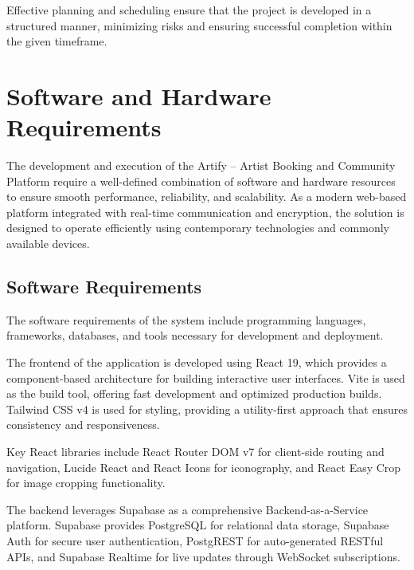 \documentclass[12pt,a4paper]{report}
\begin{document}
Effective planning and scheduling ensure that the project is developed in a structured manner, minimizing risks and ensuring successful completion within the given timeframe.

\setcounter{chapter}{3}
\clearpage
\thispagestyle{empty}

\noindent
{}

\clearpage
{}
\setcounter{section}{0}
\section{Software and Hardware Requirements}

The development and execution of the Artify -- Artist Booking and Community Platform require a well-defined combination of software and hardware resources to ensure smooth performance, reliability, and scalability. As a modern web-based platform integrated with real-time communication and encryption, the solution is designed to operate efficiently using contemporary technologies and commonly available devices.

\subsection{Software Requirements}

The software requirements of the system include programming languages, frameworks, databases, and tools necessary for development and deployment.

The frontend of the application is developed using React 19, which provides a component-based architecture for building interactive user interfaces. Vite is used as the build tool, offering fast development and optimized production builds. Tailwind CSS v4 is used for styling, providing a utility-first approach that ensures consistency and responsiveness.

Key React libraries include React Router DOM v7 for client-side routing and navigation, Lucide React and React Icons for iconography, and React Easy Crop for image cropping functionality.

The backend leverages Supabase as a comprehensive Backend-as-a-Service platform. Supabase provides PostgreSQL for relational data storage, Supabase Auth for secure user authentication, PostgREST for auto-generated RESTful APIs, and Supabase Realtime for live updates through WebSocket subscriptions.
\end{document}
